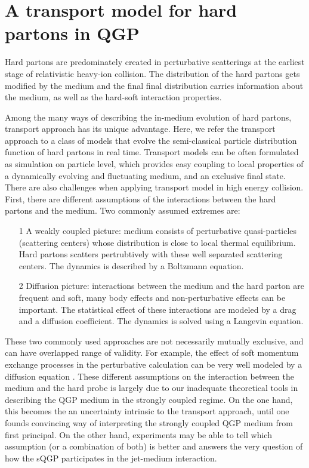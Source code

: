 \chapter{A transport model for hard partons in QGP}
\label{chapter:transport}
Hard partons are predominately created in perturbative scatterings at the earliest stage of relativistic heavy-ion collision.
The distribution of the hard partons gets modified by the medium and the final final distribution carries information about the medium, as well as the hard-soft interaction properties.

Among the many ways of describing the in-medium evolution of hard partons, 
transport approach has its unique advantage. 
Here, we refer the transport approach to a class of models that evolve the semi-classical particle distribution function of hard partons in real time.
Transport models can be often formulated as simulation on particle level, which provides easy coupling to local properties of a dynamically evolving and fluctuating medium, and an exclusive final state.
There are also challenges when applying transport model in high energy collision.
First, there are different assumptions of the interactions between the hard partons and the medium.
Two commonly assumed extremes are:
\begin{itemize}
\item[1] A weakly coupled picture: medium consists of perturbative quasi-particles (scattering centers) whose distribution is close to local thermal equilibrium.
Hard partons scatters pertrubtively with these well separated scattering centers. The dynamics is described by a Boltzmann equation.
\item[2] Diffusion picture: interactions between the medium and the hard parton are frequent and soft, many body effects and non-perturbative effects can be important. The statistical effect of these interactions are modeled by a drag and a diffusion coefficient. The dynamics is solved using a Langevin equation.
\end{itemize}
These two commonly used approaches are not necessarily mutually exclusive, and can have overlapped range of validity. 
For example, the effect of soft momentum exchange processes in the perturbative calculation can be very well modeled by a diffusion equation \cite{Ghiglieri:2015ala,Dai:2019hbi}.
These different assumptions on the interaction between the medium and the hard probe is largely due to our inadequate theoretical tools in describing the QGP medium in the strongly coupled regime.
On the one hand, this becomes the an uncertainty intrinsic to the transport approach, until one founds convincing way of interpreting the strongly coupled QGP medium from first principal.
On the other hand, experiments may be able to tell which assumption (or a combination of both) is better and answers the very question of how the sQGP participates in the jet-medium interaction.

